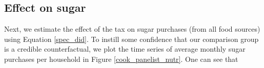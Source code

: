 \documentclass[12pt]{article}
\begin{document}
%
%
%

\subsection{Effect on sugar}

Next, we estimate the effect of the tax on sugar purchases (from all food sources) using Equation \ref{spec_did}. To instill some confidence that our comparison group is a credible counterfactual, we plot the time series of average monthly sugar purchases per household in Figure \ref{cook_panelist_nutr}. One can see that %

\end{document}
